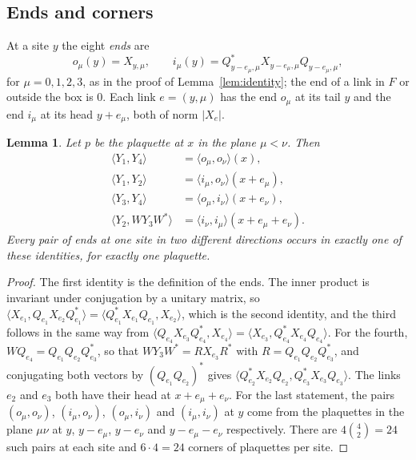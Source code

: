\documentclass[aps,prd,twocolumn,superscriptaddress,nofootinbib,longbibliography,floatfix,amsmath,amssymb,10pt]{revtex4-2}
\newtheorem{lemma}[theorem]{Lemma}
\theoremstyle{definition}
\theoremstyle{remark}
\newcommand{\ip}[2]{\langle #1,#2\rangle}
\begin{document}
\subsection{Ends and corners}

At a site $y$ the eight \emph{ends} are
\[
o_\mu(y)=X_{y,\mu},\qquad
i_\mu(y)=Q^*_{y-e_\mu,\mu}X_{y-e_\mu,\mu}Q_{y-e_\mu,\mu},
\]
for $\mu=0,1,2,3$, as in the proof of Lemma~\ref{lem:identity}; the end of a
link in $F$ or outside the box is $0$. Each link $e=(y,\mu)$ has the end
$o_\mu$ at its tail $y$ and the end $i_\mu$ at its head $y+e_\mu$, both of
norm $|X_e|$.

\begin{lemma}\label{lem:corners}
Let $p$ be the plaquette at $x$ in the plane $\mu<\nu$. Then
\[
\begin{aligned}
\ip{Y_1}{Y_4}&=\ip{o_\mu}{o_\nu}(x),\\
\ip{Y_1}{Y_2}&=\ip{i_\mu}{o_\nu}(x+e_\mu),\\
\ip{Y_3}{Y_4}&=\ip{o_\mu}{i_\nu}(x+e_\nu),\\
\ip{Y_2}{WY_3W^*}&=\ip{i_\nu}{i_\mu}(x+e_\mu+e_\nu).
\end{aligned}
\]
Every pair of ends at one site in two different directions occurs in
exactly one of these identities, for exactly one plaquette.
\end{lemma}

\begin{proof}
The first identity is the definition of the ends. The inner product is
invariant under conjugation by a unitary matrix, so
$\ip{X_{e_1}}{Q_{e_1}X_{e_2}Q_{e_1}^*}=\ip{Q_{e_1}^*X_{e_1}Q_{e_1}}{X_{e_2}}$,
which is the second identity, and the third follows in the same way from
$\ip{Q_{e_4}X_{e_3}Q_{e_4}^*}{X_{e_4}}=\ip{X_{e_3}}{Q_{e_4}^*X_{e_4}Q_{e_4}}$.
For the fourth, $WQ_{e_4}=Q_{e_1}Q_{e_2}Q_{e_3}^*$, so that $WY_3W^*=
RX_{e_3}R^*$ with $R=Q_{e_1}Q_{e_2}Q_{e_3}^*$, and conjugating both vectors
by $(Q_{e_1}Q_{e_2})^*$ gives
$\ip{Q_{e_2}^*X_{e_2}Q_{e_2}}{Q_{e_3}^*X_{e_3}Q_{e_3}}$. The links $e_2$ and
$e_3$ both have their head at $x+e_\mu+e_\nu$. For the last statement, the
pairs $(o_\mu,o_\nu)$, $(i_\mu,o_\nu)$, $(o_\mu,i_\nu)$ and $(i_\mu,i_\nu)$
at $y$ come from the plaquettes in the plane $\mu\nu$ at $y$, $y-e_\mu$,
$y-e_\nu$ and $y-e_\mu-e_\nu$ respectively. There are $4\binom42=24$ such
pairs at each site and $6\cdot4=24$ corners of plaquettes per site.
\end{proof}
\end{document}

